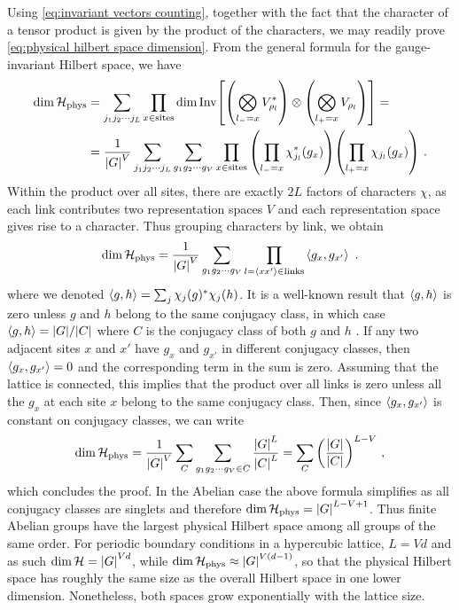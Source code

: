 Using \eqref{eq:invariant vectors counting}, together with the fact that the character of a tensor product is given by the product of the characters, we may readily prove \eqref{eq:physical hilbert space dimension}. From the general formula for the gauge-invariant Hilbert space, we have
\begin{align}
    \dim{\mathcal{H}_{\mathrm{phys}}} &=\sum_{j_1 j_2 \cdots j_L} \prod_{x \in \mathrm{sites}} \dim\mathrm{Inv}\bqty{\pqty{\bigotimes_{l_- = x}  V_{\rho_l}^*} \otimes \pqty{\bigotimes_{l_+ = x}  V_{\rho_l}}} = \nonumber \\
    &=\frac{1}{\abs{G}^V}\sum_{j_1 j_2 \cdots j_L} \sum_{g_1 g_2 \cdots g_V} \prod_{x \in \mathrm{sites}} \pqty{\prod_{l_- = x}  \chi_{j_l}^*(g_x)}  \pqty{\prod_{l_+ = x} \chi_{j_l}(g_x)} \nonumber \ .
\end{align}
Within the product over all sites, there are exactly $2L$ factors of characters $\chi$, as each link contributes two representation spaces $V$ and each representation space gives rise to a character. Thus grouping characters by link, we obtain
\begin{equation}
    \dim{\mathcal{H}_{\mathrm{phys}}} =\frac{1}{\abs{G}^V} \sum_{g_1 g_2 \cdots g_V} \prod_{l = \expval{xx'} \in \mathrm{links}} \expval{g_x, g_{x'}} \ .
\end{equation}
where we denoted $\expval{g, h} = \sum_j \chi_j(g)^* \chi_j(h)$. It is a well-known result that $\expval{g, h}$ is zero unless $g$ and $h$ belong to the same conjugacy class, in which case $\expval{g, h} = \abs{G} / \abs{C}$ where $C$ is the conjugacy class of both $g$ and $h$ \cite{serre1967representations}. If any two adjacent sites $x$ and $x'$ have $g_x$ and $g_{x'}$ in different conjugacy classes, then $\expval{g_x, g_{x'}}=0$ and the corresponding term in the sum is zero. Assuming that the lattice is connected, this implies that the product over all links is zero unless all the $g_x$ at each site $x$ belong to the same conjugacy class. Then, since $\expval{g_x, g_{x'}}$ is constant on conjugacy classes, we can write
\begin{equation}
    \dim{\mathcal{H}_{\mathrm{phys}}}
    =\frac{1}{\abs{G}^V} \sum_C \sum_{g_1 g_2 \cdots g_V \in C} \frac{\abs{G}^L}{\abs{C}^L} = \sum_C  \pqty{\frac{\abs{G}}{\abs{C}}}^{L-V} \ ,
\end{equation}
which concludes the proof.
In the Abelian case the above formula simplifies as all conjugacy classes are singlets and therefore $\dim{\mathcal{H}_{\mathrm{phys}}} = \abs{G}^{L-V+1}$.
Thus finite Abelian groups have the largest physical Hilbert space among all groups of the same order.
For periodic boundary conditions in a hypercubic lattice, $L=Vd$ and as such $\dim{\mathcal{H}}=\abs{G}^{Vd}$, while $\dim{\mathcal{H}_{\mathrm{phys}}} \approx \abs{G}^{V (d-1)}$, so that the physical Hilbert space has roughly the same size as the overall Hilbert space in one lower dimension.
Nonetheless, both spaces grow exponentially with the lattice size.

